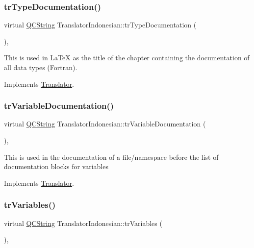 \subsubsection{\texorpdfstring{trTypeDocumentation()}{trTypeDocumentation()}}
{\footnotesize\ttfamily virtual \mbox{\hyperlink{class_q_c_string}{Q\+C\+String}} Translator\+Indonesian\+::tr\+Type\+Documentation (\begin{DoxyParamCaption}{ }\end{DoxyParamCaption})\hspace{0.3cm}{\ttfamily [inline]}, {\ttfamily [virtual]}}

This is used in La\+TeX as the title of the chapter containing the documentation of all data types (Fortran). 

Implements \mbox{\hyperlink{class_translator}{Translator}}.

\mbox{\label{class_translator_indonesian_a914aab0144b3fa3dd628d6be0a8256de}} 
\subsubsection{\texorpdfstring{trVariableDocumentation()}{trVariableDocumentation()}}
{\footnotesize\ttfamily virtual \mbox{\hyperlink{class_q_c_string}{Q\+C\+String}} Translator\+Indonesian\+::tr\+Variable\+Documentation (\begin{DoxyParamCaption}{ }\end{DoxyParamCaption})\hspace{0.3cm}{\ttfamily [inline]}, {\ttfamily [virtual]}}

This is used in the documentation of a file/namespace before the list of documentation blocks for variables 

Implements \mbox{\hyperlink{class_translator}{Translator}}.

\mbox{\label{class_translator_indonesian_a9f0825817e75a82499b13048a47b5a22}} 
\subsubsection{\texorpdfstring{trVariables()}{trVariables()}}
{\footnotesize\ttfamily virtual \mbox{\hyperlink{class_q_c_string}{Q\+C\+String}} Translator\+Indonesian\+::tr\+Variables (\begin{DoxyParamCaption}{ }\end{DoxyParamCaption})\hspace{0.3cm}{\ttfamily [inline]}, {\ttfamily [virtual]}}

